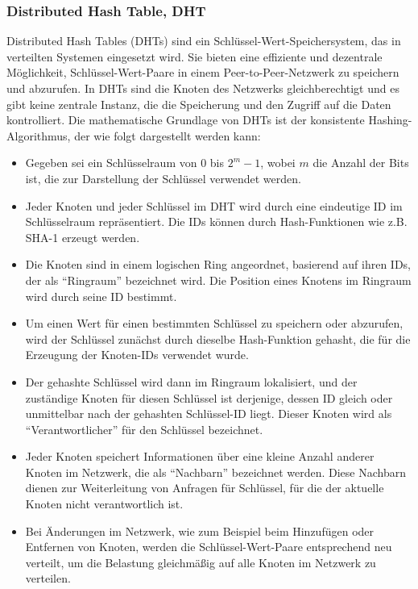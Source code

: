 \documentclass[../vs-script-first-v01.tex]{subfiles}
\begin{document}
\subsubsection{Distributed Hash Table, DHT}

Distributed Hash Tables (DHTs) sind ein Schlüssel-Wert-Speichersystem, das in verteilten Systemen eingesetzt wird. Sie bieten eine effiziente und dezentrale Möglichkeit, Schlüssel-Wert-Paare in einem Peer-to-Peer-Netzwerk zu speichern und abzurufen. In DHTs sind die Knoten des Netzwerks gleichberechtigt und es gibt keine zentrale Instanz, die die Speicherung und den Zugriff auf die Daten kontrolliert.
Die mathematische Grundlage von DHTs ist der konsistente Hashing-Algorithmus, der wie folgt dargestellt werden kann:

\begin{itemize}
\item Gegeben sei ein Schlüsselraum von $0$ bis $2^m - 1$, wobei $m$ die Anzahl der Bits ist, die zur Darstellung der Schlüssel verwendet werden.
\item Jeder Knoten und jeder Schlüssel im DHT wird durch eine eindeutige ID im Schlüsselraum repräsentiert. Die IDs können durch Hash-Funktionen wie z.B. SHA-1 erzeugt werden.
\item Die Knoten sind in einem logischen Ring angeordnet, basierend auf ihren IDs, der als \enquote{Ringraum} bezeichnet wird. Die Position eines Knotens im Ringraum wird durch seine ID bestimmt.
\item Um einen Wert für einen bestimmten Schlüssel zu speichern oder abzurufen, wird der Schlüssel zunächst durch dieselbe Hash-Funktion gehasht, die für die Erzeugung der Knoten-IDs verwendet wurde.
\item Der gehashte Schlüssel wird dann im Ringraum lokalisiert, und der zuständige Knoten für diesen Schlüssel ist derjenige, dessen ID gleich oder unmittelbar nach der gehashten Schlüssel-ID liegt. Dieser Knoten wird als \enquote{Verantwortlicher} für den Schlüssel bezeichnet.
\item Jeder Knoten speichert Informationen über eine kleine Anzahl anderer Knoten im Netzwerk, die als \enquote{Nachbarn} bezeichnet werden. Diese Nachbarn dienen zur Weiterleitung von Anfragen für Schlüssel, für die der aktuelle Knoten nicht verantwortlich ist.
\item Bei Änderungen im Netzwerk, wie zum Beispiel beim Hinzufügen oder Entfernen von Knoten, werden die Schlüssel-Wert-Paare entsprechend neu verteilt, um die Belastung gleichmäßig auf alle Knoten im Netzwerk zu verteilen.
\end{itemize}
\end{document}

